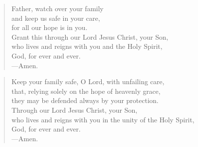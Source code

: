 \prayer

\setlength{\leftmargini}{\prayerleftmargini}

\begin{verse}
Father, watch over your family\\
and keep us safe in your care,\\
for all our hope is in you.\\
Grant this through our Lord Jesus Christ, your Son,\\
who lives and reigns with you and the Holy Spirit,\\
God, for ever and ever.\\
{\color{red}---\thinspace}Amen.
\end{verse}


\begin{verse}
Keep your family safe, O Lord, with unfailing care,\\
that, relying solely on the hope of heavenly grace,\\
they may be defended always by your protection.\\
Through our Lord Jesus Christ, your Son,\\
who lives and reigns with you in the unity of the Holy Spirit,\\
God, for ever and ever.\\
{\color{red}---\thinspace}Amen.
\end{verse}

\setlength{\leftmargini}{\defleftmargini}